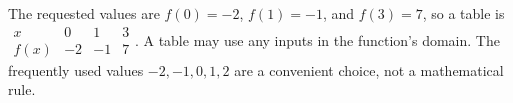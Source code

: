 The requested values are $f(0)=-2$, $f(1)=-1$, and $f(3)=7$, so a table is $\begin{array}{c|rrr}x&0&1&3\\\hline f(x)&-2&-1&7\end{array}$. A table may use any inputs in the function's domain. The frequently used values $-2,-1,0,1,2$ are a convenient choice, not a mathematical rule.
